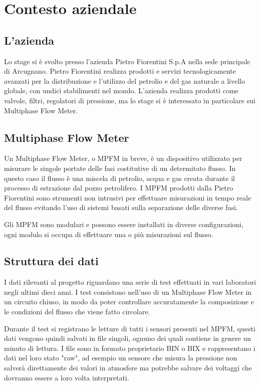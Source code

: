 
\chapter{Contesto aziendale}

\section{L'azienda}
Lo stage si è svolto presso l'azienda Pietro Fiorentini S.p.A nella sede principale di Arcugnano. Pietro Fiorentini realizza prodotti e servizi tecnologicamente avanzati per la distribuzione e l'utilizzo del petrolio e del gas naturale a livello globale, con undici stabilimenti nel mondo.
L'azienda realizza prodotti come valvole, filtri, regolatori di pressione, ma lo stage si è interessato in particolare sui Multiphase Flow Meter.

\section{Multiphase Flow Meter}
Un Multiphase Flow Meter, o MPFM in breve, è un dispositivo utilizzato per misurare le singole portate delle fasi costitutive di un determitato flusso. In questo caso il flusso è una miscela di petrolio, acqua e gas creata durante il processo di estrazione dal pozzo petrolifero.
I MPFM prodotti dalla Pietro Fiorentini sono strumenti non intrusivi per effettuare misurazioni in tempo reale del flusso  evitando l'uso di sistemi basati sulla separazione delle diverse fasi.

Gli MPFM sono modulari e possono essere installati in diverse configurazioni, ogni modulo si occupa di effettuare una o più misurazioni sul flusso.

\section{Struttura dei dati} \label{"StrutturaDeiDati"}
I dati rilevanti al progetto riguardano una serie di test effettuati in vari laboratori negli ultimi dieci anni. I test consistono nell'uso di un Multiphase Flow Meter in un circuito chiuso, in modo da poter controllare accuratamente la composizione e le condizioni del flusso che viene fatto circolare. 

Durante il test si registrano le letture di tutti i sensori presenti nel MPFM, questi dati vengono quindi salvati in file singoli, ognuno dei quali contiene in genere un minuto di lettura. I file sono in formato proprietario BIN o BIX e rappresentano i dati nel loro stato "raw", ad esempio un sensore che misura la pressione non salverà direttamente dei valori in atmosfere ma potrebbe salvare dei voltaggi che dovranno essere a loro volta interpretati.

